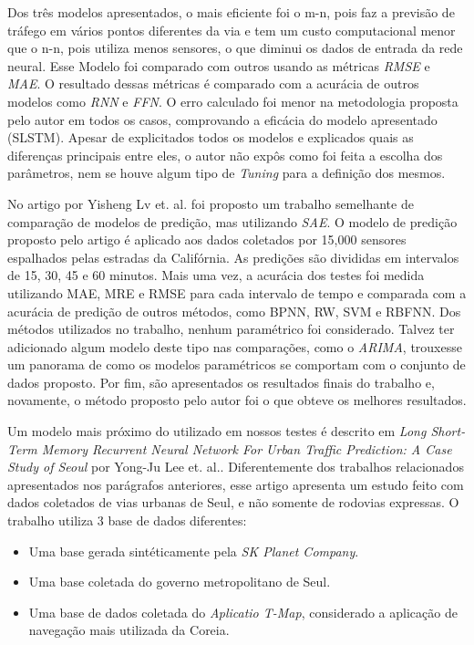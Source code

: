 Dos três modelos apresentados, o mais eficiente foi o m-n, pois faz a previsão de tráfego em vários pontos diferentes da via e tem um custo computacional menor que o n-n, pois utiliza menos sensores, o que diminui os dados de entrada da rede neural. Esse Modelo foi comparado com outros usando as métricas \textit{\acrshort{RMSE}} e \textit{\acrshort{MAE}}. O resultado dessas métricas é comparado com a acurácia de outros modelos como \textit{\acrfull{RNN}} e \textit{\acrfull{FFN}}. O erro calculado foi menor na metodologia proposta pelo autor em todos os casos, comprovando a eficácia do modelo apresentado (SLSTM). Apesar de explicitados todos os modelos e explicados quais as diferenças principais entre eles, o autor não expôs como foi feita a escolha dos parâmetros, nem se houve algum tipo de \textit{Tuning} para a definição dos mesmos.

No artigo \cite{lv_6894591} por Yisheng Lv et. al. foi proposto um trabalho semelhante de comparação de modelos de predição, mas utilizando \textit{\acrfull{SAE}}. O modelo de predição proposto pelo artigo é aplicado aos dados coletados por 15,000 sensores espalhados pelas estradas da Califórnia. As predições são divididas em intervalos de 15, 30, 45 e 60 minutos. Mais uma vez, a acurácia dos testes foi medida utilizando  \acrshort{MAE}, \acrshort{MRE} e \acrshort{RMSE} para cada intervalo de tempo e comparada com a acurácia de predição de outros métodos, como \acrfull{BPNN}, \acrfull{RW}, \acrfull{SVM} e \acrfull{RBFNN}. Dos métodos utilizados no trabalho, nenhum paramétrico foi considerado. Talvez ter adicionado algum modelo deste tipo nas comparações, como o \textit{ARIMA}, trouxesse um panorama de como os modelos paramétricos se comportam com o conjunto de dados proposto. Por fim, são apresentados os resultados finais do trabalho e, novamente, o método proposto pelo autor foi o que obteve os melhores resultados. 

Um modelo mais próximo do utilizado em nossos testes é descrito em \textit{Long Short-Term Memory Recurrent Neural Network For Urban Traffic Prediction: A Case Study of Seoul} \cite{Seoul} por Yong-Ju Lee et. al.. Diferentemente dos trabalhos relacionados apresentados nos parágrafos anteriores, esse artigo apresenta um estudo feito com dados coletados de vias urbanas de Seul, e não somente de rodovias expressas. O trabalho utiliza 3 base de dados diferentes:

\begin{itemize}
    \item Uma base gerada sintéticamente pela \textit{SK Planet Company}.
    \item Uma base coletada do governo metropolitano de Seul.
    \item Uma base de dados coletada do \textit{Aplicatio T-Map}, considerado a aplicação de navegação mais utilizada da Coreia.
\end{itemize} 

